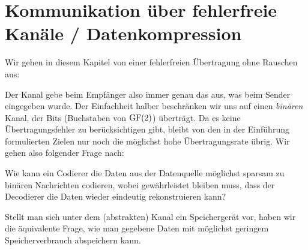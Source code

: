 \section{Kommunikation über fehlerfreie Kanäle / Datenkompression}\label{chap:sourceCoding}
Wir gehen in diesem Kapitel von einer fehlerfreien Übertragung ohne Rauschen aus:
\begin{Center}
\end{Center}
Der Kanal gebe beim Empfänger also immer genau das aus, was beim Sender eingegeben wurde. Der Einfachheit halber beschränken wir uns auf einen \emph{binären} Kanal, der Bits (Buchstaben von $\operatorname{GF}(2)$) überträgt. Da es keine Übertragungsfehler zu berücksichtigen gibt, bleibt von den in der Einführung formulierten Zielen nur noch die möglichst hohe Übertragungsrate übrig. Wir gehen also folgender Frage nach:
\begin{question}\label{q:sourceCoding}
  Wie kann ein Codierer die Daten aus der Datenquelle möglichst sparsam zu binären Nachrichten codieren, wobei gewährleistet bleiben muss, dass der Decodierer die Daten wieder eindeutig rekonstruieren kann?
  
  Stellt man sich unter dem (abstrakten) Kanal ein Speichergerät vor, haben wir die äquivalente Frage, wie man gegebene Daten mit möglichst geringem Speicherverbrauch abspeichern kann.
\end{question}

